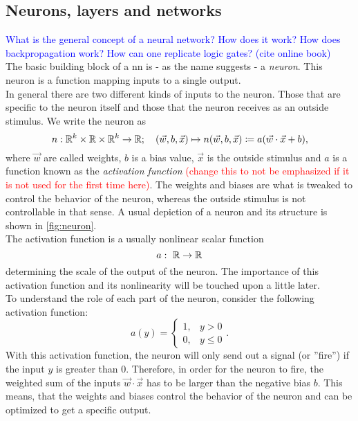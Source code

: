 \subsection{Neurons, layers and networks}\label{sec:basics_neuron_network}
\textcolor{blue}{What is the general concept of a neural network? How does it work? How does backpropagation work? How can one replicate logic gates? (cite online book)}\\
\noindent The basic building block of a \gls{nn} is - as the name suggests - a \emph{neuron}. This neuron is a function mapping inputs to a single output.\\
In general there are two different kinds of inputs to the neuron. Those that are specific to the neuron itself and those that the neuron receives as an outside stimulus. We write the neuron as
\begin{equation}\label{def:neuron}
n: \mathbb{R}^k\times\mathbb{R}\times\mathbb{R}^k\to\mathbb{R} ;\ \ \ (\vec{w}, b, \vec{x})\mapsto n(\vec{w}, b, \vec{x})\coloneqq a(\vec{w}\cdot\vec{x}+b),
\end{equation}
where $\vec{w}$ are called weights, $b$ is a bias value, $\vec{x}$ is the outside stimulus and $a$ is a function known as the \emph{activation function}\textcolor{red}{ (change this to not be emphasized if it is not used for the first time here)}. The weights and biases are what is tweaked to control the behavior of the neuron, whereas the outside stimulus is not controllable in that sense. A usual depiction of a neuron and its structure is shown in \autoref{fig:neuron}.\\
The activation function is a usually nonlinear scalar function
\begin{equation}\label{def:activation_function}
a:\ \mathbb{R}\to\mathbb{R}
\end{equation}
determining the scale of the output of the neuron. The importance of this activation function and its nonlinearity will be touched upon a little later.\\
To understand the role of each part of the neuron, consider the following activation function:
\begin{equation}\label{def:step_activation}
a(y) = 
\begin{cases}
	1,& y> 0\\
	0,& y\leq 0
\end{cases}.
\end{equation}
With this activation function, the neuron will only send out a signal (or ''fire'') if the input $y$ is greater than 0. Therefore, in order for the neuron to fire, the weighted sum of the inputs $\vec{w}\cdot\vec{x}$ has to be larger than the negative bias $b$. This means, that the weights and biases control the behavior of the neuron and can be optimized to get a specific output.\\
